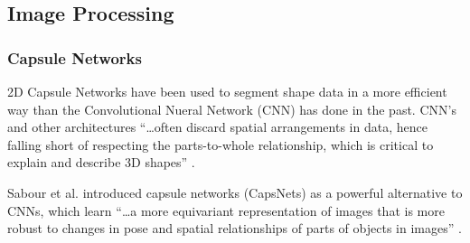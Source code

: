 \documentclass[letterpaper]{article} %
\begin{document}
\subsection{Image Processing}
%
%

\subsubsection{Capsule Networks}
2D Capsule Networks have been used to segment shape data in a
more efficient way than the Convolutional Nueral Network (CNN) has
done in the past. CNN's and other architectures
``\dots often discard
spatial arrangements in data, hence falling short of respecting
the parts-to-whole relationship, which is critical to explain
and describe 3D shapes'' \cite{3D_capsule_networks}.

Sabour et al. \cite{dynamic_routing_capsules} introduced capsule networks (CapsNets) as a powerful
alternative to CNNs, which learn ``\dots a more equivariant representation of images
that is more robust to changes in pose and spatial relationships of parts of objects
in images'' \cite{transforming_auto-encoders}.
\end{document}
